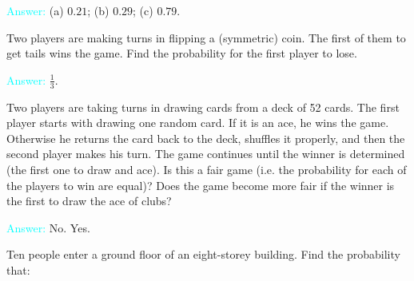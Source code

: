 \documentclass[14pt]{exam}
\begin{document}
\begin{questions}
		
		\textcolor{cyan}{Answer:} (a) $0.21$; (b) $0.29$; (c) $0.79$.
		
		\question
		Two players are making turns in flipping a (symmetric) coin. The first of them to get tails wins the game. Find the probability for the first player to lose.
		
		\textcolor{cyan}{Answer:} $\frac{1}{3}$.
		
		\question
		Two players are taking turns in drawing cards from a deck of 52 cards. The first player starts with drawing one random card. If it is an ace, he wins the game. Otherwise he returns the card back to the deck, shuffles it properly, and then the second player makes his turn. The game continues until the winner is determined (the first one to draw and ace). Is this a fair game (i.e. the probability for each of the players to win are equal)? Does the game become more fair if the winner is the first to draw the ace of clubs?
		
		\textcolor{cyan}{Answer:} No. Yes.
		
		\question
		Ten people enter a ground floor of an eight-storey building. Find the probability that:
\end{questions}
\end{document}
